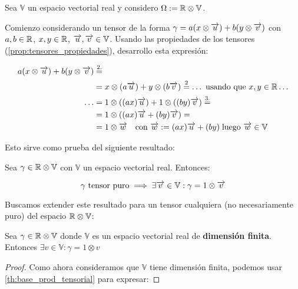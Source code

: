\begin{ejemplo}
    Sea $\mathbb{V}$ un espacio vectorial real y considero $\Omega := \mathbb{R} \otimes \mathbb{V}$.

    Comienzo considerando un tensor de la forma $\gamma = a(x \otimes \overrightarrow{u}) + b(y \otimes \overrightarrow{v})$ con $a, b \in \mathbb{R}$, $x, y \in \mathbb{R}$, $\overrightarrow{u}, \overrightarrow{v} \in \mathbb{V}$. Usando las propiedades de los tensores (\ref{prop:tensores_propiedades}), desarrollo esta expresión:

    \begin{equation}
    \begin{split}
        a(x \otimes \overrightarrow{u}) + b(y \otimes \overrightarrow{v}) &\stackrel{\text{2.}}{=} \\
        &= x \otimes (a\overrightarrow{u}) + y \otimes (b\overrightarrow{v}) \stackrel{\text{2}}{=} \ldots \text{ usando que }  x,y \in \mathbb{R} \ldots \\
        \ldots &= 1 \otimes ((ax) \overrightarrow{u}) + 1 \otimes ((by) \overrightarrow{v}) \stackrel{\text{3.}}{=} \\
        &= 1 \otimes ((ax)\overrightarrow{u} + (by) \overrightarrow{v}) = \\
        &= 1 \otimes \overrightarrow{w} \quad \text{con } \overrightarrow{w} := (ax)\overrightarrow{u} + (by) \; \text{luego } \overrightarrow{w} \in \mathbb{V}
    \end{split}
    \end{equation}

    Esto sirve como prueba del siguiente resultado:

    \begin{proposicion}
        Sea $\gamma \in \mathbb{R} \otimes \mathbb{V}$ con $\mathbb{V}$ un espacio vectorial real. Entonces:

        \begin{equation}
            \gamma \text{ tensor puro} \implies \exists \overrightarrow{v} \in \mathbb{V}: \gamma = 1 \otimes \overrightarrow{v}
        \end{equation}
    \end{proposicion}

    Buscamos extender este resultado para un tensor cualquiera (no necesariamente puro) del espacio $\mathbb{R} \otimes \mathbb{V}$:

    \begin{proposicion} \label{prop:r_otimes_v_es_v}
        Sea $\gamma \in \mathbb{R} \otimes \mathbb{V}$ donde $\mathbb{V}$ es un espacio vectorial real de \textbf{dimensión finita}. Entonces $\exists v \in \mathbb{V}: \gamma = 1 \otimes v$
    \end{proposicion}
    \begin{proof}
        Como ahora consideramos que $\mathbb{V}$ tiene dimensión finita, podemos usar \ref{th:base_prod_tensorial} para expresar:


\end{proof}
\end{ejemplo}
